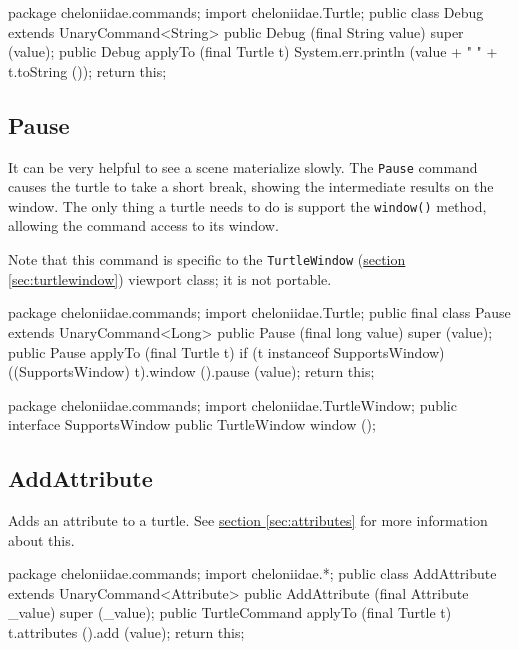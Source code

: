 \documentclass{report}
\newcommand{\Ref}[2]{\hyperref[#2]{#1 \ref*{#2}}}
\begin{document}
\begin{javacode}
package cheloniidae.commands;
import cheloniidae.Turtle;
public class Debug extends UnaryCommand<String> {
  public Debug (final String value) {super (value);}
  public Debug applyTo (final Turtle t) {
    System.err.println (value + " " + t.toString ());
    return this;
  }
}
\end{javacode}

\subsection {Pause} \label{sec:pause}
        It can be very helpful to see a scene materialize slowly. The {\tt Pause} command causes the turtle to take a short break, showing the intermediate
        results on the window. The only thing a turtle needs to do is support the {\tt window()} method, allowing the command access to its window.

        Note that this command is specific to the {\tt TurtleWindow} (\Ref{section}{sec:turtlewindow}) viewport class; it is not portable.

\begin{javacode}
package cheloniidae.commands;
import cheloniidae.Turtle;
public final class Pause extends UnaryCommand<Long> {
  public Pause (final long value) {super (value);}
  public Pause applyTo (final Turtle t) {
    if (t instanceof SupportsWindow) ((SupportsWindow) t).window ().pause (value);
    return this;
  }
}
\end{javacode}

\begin{javacode}
package cheloniidae.commands;
import cheloniidae.TurtleWindow;
public interface SupportsWindow {
  public TurtleWindow window ();
}
\end{javacode}

\subsection {AddAttribute} \label{sec:addattribute}
        Adds an attribute to a turtle. See \Ref{section}{sec:attributes} for more information about this.

\begin{javacode}
package cheloniidae.commands;
import cheloniidae.*;
public class AddAttribute extends UnaryCommand<Attribute> {
  public AddAttribute (final Attribute _value) {super (_value);}
  public TurtleCommand applyTo (final Turtle t) {
    t.attributes ().add (value);
    return this;
  }
}
\end{javacode}
\end{document}
